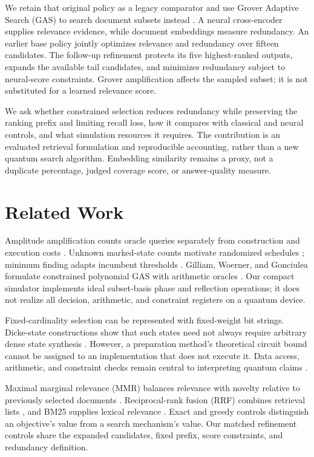 \documentclass[conference]{IEEEtran}
\begin{document}
We retain that original policy as a legacy comparator and use Grover Adaptive Search (GAS) to search document subsets instead \cite{gilliam2021gas}. A neural cross-encoder supplies relevance evidence, while document embeddings measure redundancy. An earlier base policy jointly optimizes relevance and redundancy over fifteen candidates. The follow-up refinement protects its five highest-ranked outputs, expands the available tail candidates, and minimizes redundancy subject to neural-score constraints. Grover amplification affects the sampled subset; it is not substituted for a learned relevance score.

We ask whether constrained selection reduces redundancy while preserving the ranking prefix and limiting recall loss, how it compares with classical and neural controls, and what simulation resources it requires. The contribution is an evaluated retrieval formulation and reproducible accounting, rather than a new quantum search algorithm. Embedding similarity remains a proxy, not a duplicate percentage, judged coverage score, or answer-quality measure.

\section{Related Work}\label{sec:related}
Amplitude amplification counts oracle queries separately from construction and execution costs \cite{grover1996search,brassard2002amplitude}. Unknown marked-state counts motivate randomized schedules \cite{boyer1998tight}; minimum finding adapts incumbent thresholds \cite{durr1996minimum}. Gilliam, Woerner, and Gonciulea formulate constrained polynomial GAS with arithmetic oracles \cite{gilliam2021gas}. Our compact simulator implements ideal subset-basis phase and reflection operations; it does not realize all decision, arithmetic, and constraint registers on a quantum device.

Fixed-cardinality selection can be represented with fixed-weight bit strings. Dicke-state constructions show that such states need not always require arbitrary dense state synthesis \cite{bartschi2019dicke}. However, a preparation method's theoretical circuit bound cannot be assigned to an implementation that does not execute it. Data access, arithmetic, and constraint checks remain central to interpreting quantum claims \cite{montanaro2016quantum}.

Maximal marginal relevance (MMR) balances relevance with novelty relative to previously selected documents \cite{carbonell1998mmr}. Reciprocal-rank fusion (RRF) combines retrieval lists \cite{cormack2009rrf}, and BM25 supplies lexical relevance \cite{robertson2009bm25}. Exact and greedy controls distinguish an objective's value from a search mechanism's value. Our matched refinement controls share the expanded candidates, fixed prefix, score constraints, and redundancy definition.
\end{document}

